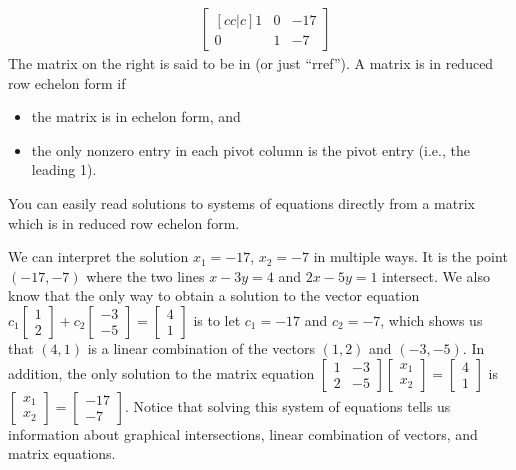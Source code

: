 \begin{example}
$$\begin{array}{rr}
&
\begin{bmatrix}[cc|c] 1&0&-17\\0&1&-7
\end{bmatrix} 
\end{array}
$$
The matrix on the right is said to be in  (or just ``rref''). 
%
A matrix is in reduced row echelon form if 
\begin{itemize}
	\item the matrix is in echelon form, and 
	\item the only nonzero entry in each pivot column is the pivot entry (i.e., the leading 1).
\end{itemize}
 You can easily read solutions to systems of equations directly from a matrix which is in reduced row echelon form.

We can interpret the solution $x_1=-17$, $x_2=-7$ in multiple ways.  It is the point $(-17,-7)$ where the two lines $x-3y=4$ and $
2x-5y=1$ intersect.  We also know that the only way to obtain a solution to the vector equation 
$c_1
\begin{bmatrix}
1\\
2
\end{bmatrix}
+
c_2
\begin{bmatrix}
-3\\
-5
\end{bmatrix}
=
\begin{bmatrix}
4\\
1
\end{bmatrix}
$ is to let $c_1=-17$ and $c_2=-7$, which shows us that $(4,1)$ is a linear combination of the vectors $(1,2)$ and $(-3,-5)$.  In addition, the only solution to the matrix equation 
$\begin{bmatrix}1&-3\\ 2 &-5 \end{bmatrix}\begin{bmatrix}x_1\\ x_2\end{bmatrix}=\begin{bmatrix}4\\1\end{bmatrix}$ 
is 
$\begin{bmatrix}x_1\\x_2\end{bmatrix}=\begin{bmatrix}-17\\-7\end{bmatrix}$.   Notice that solving this system of equations tells us information about graphical intersections, linear combination of vectors, and matrix equations.
\end{example}


